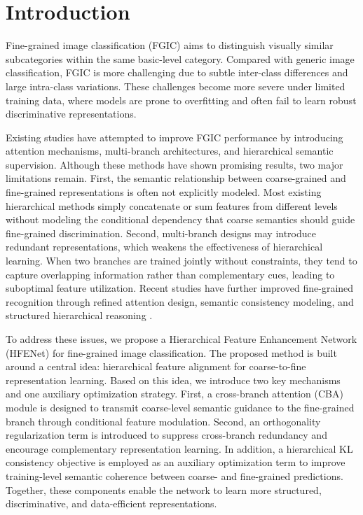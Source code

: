 \documentclass[pdflatex,sn-mathphys-num]{sn-jnl}
\theoremstyle{thmstyleone}%
\theoremstyle{thmstyletwo}%
\theoremstyle{thmstylethree}%
\begin{document}
\maketitle

\section{Introduction}
\label{sec:introduction}

Fine-grained image classification (FGIC) aims to distinguish visually similar subcategories within the same basic-level category. 
Compared with generic image classification, FGIC is more challenging due to subtle inter-class differences and large intra-class variations. 
These challenges become more severe under limited training data, where models are prone to overfitting and often fail to learn robust discriminative representations.

Existing studies have attempted to improve FGIC performance by introducing attention mechanisms, multi-branch architectures, and hierarchical semantic supervision. 
Although these methods have shown promising results, two major limitations remain. 
First, the semantic relationship between coarse-grained and fine-grained representations is often not explicitly modeled. 
Most existing hierarchical methods simply concatenate or sum features from different levels without modeling the conditional dependency that coarse semantics should guide fine-grained discrimination. 
Second, multi-branch designs may introduce redundant representations, which weakens the effectiveness of hierarchical learning. 
When two branches are trained jointly without constraints, they tend to capture overlapping information rather than complementary cues, leading to suboptimal feature utilization.
Recent studies have further improved fine-grained recognition through refined attention design, semantic consistency modeling, and structured hierarchical reasoning \cite{wang2025crasmra,wang2025cfgvc,gao2025chbc}.

To address these issues, we propose a Hierarchical Feature Enhancement Network (HFENet) for fine-grained image classification. 
The proposed method is built around a central idea: hierarchical feature alignment for coarse-to-fine representation learning. 
Based on this idea, we introduce two key mechanisms and one auxiliary optimization strategy. 
First, a cross-branch attention (CBA) module is designed to transmit coarse-level semantic guidance to the fine-grained branch through conditional feature modulation. 
Second, an orthogonality regularization term is introduced to suppress cross-branch redundancy and encourage complementary representation learning. 
In addition, a hierarchical KL consistency objective is employed as an auxiliary optimization term to improve training-level semantic coherence between coarse- and fine-grained predictions. 
Together, these components enable the network to learn more structured, discriminative, and data-efficient representations.
\end{document}
